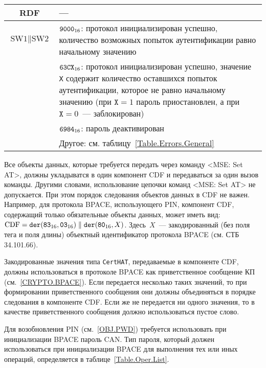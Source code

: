 \begin{table}[H]
\begin{tabular}{|c|p{14cm}|}
\hline 
\hline
RDF &  --- \\
\hline
$\text{SW1} \parallel \text{SW2}$ & 
  $\texttt{9000}_{16}$: протокол инициализирован успешно,
количество возможных попыток аутентификации равно начальному значению \\
\cline{2-2}
 & $\texttt{63CX}_{16}$: протокол инициализирован успешно,
значение \texttt{X} содержит количество 
оставшихся попыток аутентификации, которое не равно начальному значению
(при $\texttt{X} = 1$ пароль приостановлен, а при $\texttt{X} = 0$~--- заблокирован)
\\
\cline{2-2}
& $\texttt{6984}_{16}$: пароль деактивирован \\
\cline{2-2}
 & Другое: см. таблицу~\ref{Table.Errors.General} \\
\hline
\end{tabular}
\end{table}

Все объекты данных, которые требуется передать через команду <MSE: Set AT>,
должны укладыватся в один компонент CDF и передаваться за один вызов команды.
Другими словами, использование цепочки команд <MSE: Set AT> не допускается. 
При этом порядок следования объектов данных в CDF не важен. 
Например, для протокола BPACE, использующего PIN, компонент CDF, 
содержащий только обязательные объекты данных, может иметь вид: 
$\text{CDF} = \texttt{der}(\texttt{83}_{16},\texttt{03}_{16}) \parallel \texttt{der}(\texttt{80}_{16}, X)$. 
Здесь~$X$~--- закодированный (без поля тега и поля длины) объектный 
идентификатор протокола BPACE (см. СТБ 34.101.66).

Закодированные значения типа \verb|CertHAT|, передаваемые в компоненте CDF, 
должны использоваться в протоколе BPACE как приветственное сообщение КП
(см.~\ref{CRYPTO.BPACE}).
%
Если передается несколько таких значений, то при формировании приветственного
сообщения они должны объединяться в порядке следования в компоненте CDF. Если же
не передается ни одного значения, то в качестве приветственного сообщения должно
использоваться пустое слово.
 

Для возобновления PIN (см.~\ref{OBJ.PWD}) требуется 
использовать при инициализации BPACE пароль CAN. 
Тип пароля, который должен использоваться при 
инициализации BPACE для выполнения тех или иных
операций, определяется в таблице~\ref{Table.Oper.List}.

